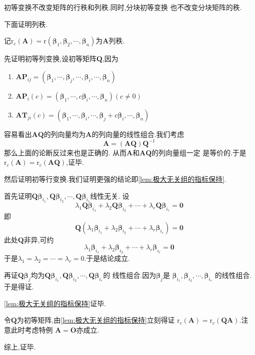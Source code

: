 \begin{formal}
\begin{theorem}[初等变换不改变秩]\label{thm:初等变换不改变秩}
    初等变换不改变矩阵的行秩和列秩.同时,分块初等变换
    也不改变分块矩阵的秩.
\end{theorem}
\begin{Proof}
下面证明列秩.

记$\mathrm{r}_c\left(\bm{A}\right)=
\mathrm{r}\left(\bm{\beta}_1,\bm{\beta}_2,
\cdots,\bm{\beta}_n\right)$为$\bm{A}$列秩.

先证明初等列变换,设初等矩阵$\bm{Q}$,因为
\begin{enumerate}[label=\textup{(\arabic*)}]
    \item $\bm{AP}_{ij}=\left(\bm{\beta}_1,\cdots,\bm{\beta}_j,\cdots,\bm{\beta}_i,\cdots,\bm{\beta}_n\right)$
    \item $\bm{AP}_i\left(c\right)=\left(\bm{\beta}_1,\cdots,c\bm{\beta}_i,\cdots,\bm{\beta}_n\right)\left(c \neq 0\right)$
    \item $\bm{AT}_{ji}\left(c\right)=\left(\bm{\beta}_1,\cdots,\bm{\beta}_i,\cdots,\bm{\beta}_j+c\bm{\beta}_i,\cdots,\bm{\beta}_n\right)$
\end{enumerate}

容易看出$\bm{AQ}$的列向量均为$\bm{A}$的列向量的线性组合.我们考虑
\[
\bm{A}=\left(\bm{AQ}\right)\bm{Q}^{-1}
\]
那么上面的论断反过来也是正确的.
从而$\bm{A}$和$\bm{AQ}$的列向量组一定
是等价的.于是
$\mathrm{r}_c\left(\bm{A}\right)=\mathrm{r}_c\left(\bm{AQ}\right)$,证毕.

然后证明初等行变换.我们证明更强的结论即\cref{lem:极大无关组的指标保持}.

首先证明$\bm{Q\beta}_{i_1},\bm{Q\beta}_{i_2},\cdots,\bm{Q\beta}_{i_r}$线性无关.
设
\[
\lambda_1\bm{Q\beta}_{i_1}+\lambda_2\bm{Q\beta}_{i_2}+\cdots+\lambda_r\bm{Q\beta}_{i_r}=\bm{0}
\]
即
\[
\bm{Q}\left(\lambda_1\bm{\beta}_{i_1}+\lambda_2\bm{\beta}_{i_2}+\cdots+\lambda_r\bm{\beta}_{i_r}\right)=\bm{0}
\]
此处$\bm{Q}$非异,可约
\[
\lambda_1\bm{\beta}_{i_1}+\lambda_2\bm{\beta}_{i_2}+\cdots+\lambda_r\bm{\beta}_{i_r}=\bm{0}
\]
于是$\lambda_1=\lambda_2=\cdots=\lambda_r=0$.于是结论成立.

再证$\bm{Q\beta}_j$均为$\bm{Q\beta}_{i_1},\bm{Q\beta}_{i_2},\cdots,\bm{Q\beta}_{i_r}$的
线性组合.因为$\bm{\beta}_j$是
$\bm{\beta}_{i_1},\bm{\beta}_{i_2},\cdots,\bm{\beta}_{i_r}$
的线性组合.于是得证.

\cref{lem:极大无关组的指标保持}证毕.

令$\bm{Q}$为初等矩阵,由\cref{lem:极大无关组的指标保持}立刻得证
$\mathrm{r}_c\left(\bm{A}\right)=
\mathrm{r}_c\left(\bm{QA}\right)$.注意此时考虑特例
$\bm{A}=\bm{O}$亦成立.

综上,证毕.
\end{Proof}
\end{formal}
